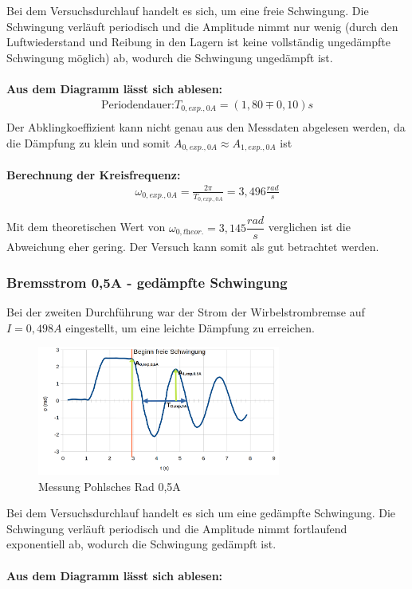\documentclass[a4paper]{scrartcl}
\numberwithin{equation}{subsection}
\begin{document}
Bei dem Versuchsdurchlauf handelt es sich, um eine freie Schwingung. Die Schwingung verläuft periodisch und die Amplitude nimmt nur wenig (durch den Luftwiederstand und Reibung in den Lagern ist keine vollständig ungedämpfte Schwingung möglich) ab, wodurch die Schwingung ungedämpft ist.
\\ \\
\textbf{Aus dem Diagramm lässt sich ablesen:}
\begin{align*}
\text{Periodendauer:} T_{0,\textit{exp.},0A} = (1,80\mp0,10)s \\
\end{align*}
Der Abklingkoeffizient kann nicht genau aus den Messdaten abgelesen werden, da die Dämpfung zu klein und somit $A_{0,\textit{exp.},0A} \approx A_{1,\textit{exp.},0A}$ ist
\\ \\
\textbf{Berechnung der Kreisfrequenz:}
\begin{align}
\omega_{0,\textit{exp.},0A} = \frac{2\pi}{T_{0,\textit{exp.},0A}} = 3,496 \frac{rad}{s}
\end{align}

Mit dem theoretischen Wert von $\omega_{0,\textit{theor.}} = 3,145 \dfrac{rad}{s}$ verglichen ist die Abweichung eher gering. Der Versuch kann somit als gut betrachtet werden.


\subsubsection{Bremsstrom 0,5A - gedämpfte Schwingung}
Bei der zweiten Durchführung war der Strom der Wirbelstrombremse auf $I = 0,498A$ eingestellt, um eine leichte Dämpfung zu erreichen.

\begin{figure}[H]
\includegraphics[width=8cm]{Messung_Rad_graph_05A}
\centering
\caption{Messung Pohlsches Rad 0,5A}
\centering
\end{figure}

Bei dem Versuchsdurchlauf handelt es sich um eine gedämpfte Schwingung. Die Schwingung verläuft periodisch und die Amplitude nimmt fortlaufend exponentiell ab, wodurch die Schwingung gedämpft ist.
\\ \\
\textbf{Aus dem Diagramm lässt sich ablesen:}
\end{document}
